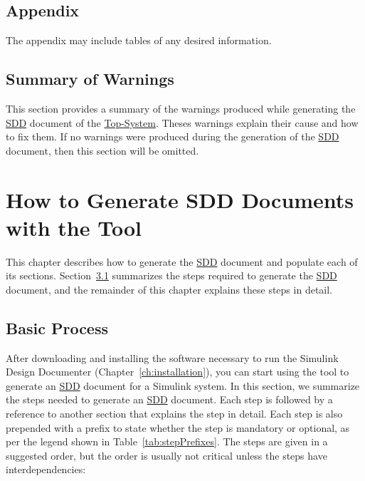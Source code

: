 \documentclass{mcscert}
\newcommand{\simulink}{Simulink}
\newcommand{\sddtool}{Simulink Design Documenter}
\newcommand{\topsystemnolink}{Top-System} %
\newcommand{\topsystem}{\hyperref[def:topsystem]{\topsystemnolink{}}}
\begin{document}
\section{Appendix} 
\label{sec:app-description}
The appendix may include tables of any desired information. 

\section{Summary of Warnings} 
\label{sec:summ-warnings}
This section provides a summary of the warnings produced while generating the \hyperref[acr:sdd]{SDD} document of the \topsystem{}. 
Theses warnings explain their cause  and how to fix them. 
If no warnings were produced during the generation of the \hyperref[acr:sdd]{SDD} document, then this section will be omitted.

\chapter{How to Generate SDD Documents with the Tool}
\label{ch:doc-process}
This chapter describes how to generate the \hyperref[acr:sdd]{SDD} document and populate each of its sections. 
Section~\ref{sec:basic-proc} summarizes the steps required to generate the \hyperref[acr:sdd]{SDD} document, and the remainder of this chapter explains these steps in detail.

\section{Basic Process}
\label{sec:basic-proc}

After downloading and installing the software necessary to run the \sddtool{} (Chapter~\ref{ch:installation}), you can start using the tool to generate an \hyperref[acr:sdd]{SDD} document for a \simulink{} system. 
In this section, we summarize the steps needed to generate an \hyperref[acr:sdd]{SDD} document. 
Each step is followed by a reference to another section that explains the step in detail. 
Each step is also prepended with a prefix to state whether the step is mandatory or optional, as per the legend shown in Table~\ref{tab:stepPrefixes}. 
The steps are given in a suggested order, but the order is usually not critical unless the steps have interdependencies:
\end{document}
